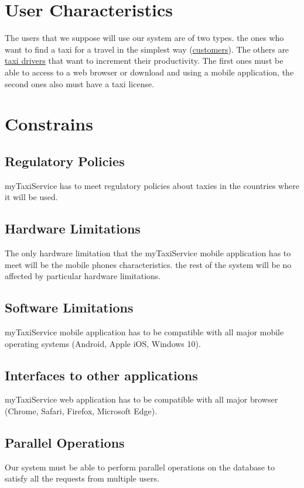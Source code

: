 \documentclass{report}
\begin{document}
	\section{User Characteristics}
	The users that we suppose will use our system are of two types. the ones who want to find a taxi for a travel in the simplest way (\hyperref[sec:customer]{customers}). The others are \hyperref[sec:tdriver]{taxi drivers} that want to increment their productivity. The first ones must be able to access to a web browser or download and using a mobile application, the second ones also must have a taxi license.
		
	\section{Constrains}
		
		\subsection{Regulatory Policies}
		myTaxiService  has to meet regulatory policies about taxies in the countries where it will be used.

		\subsection{Hardware Limitations}
		The only hardware limitation that the myTaxiService mobile application has to meet will be the mobile phones characteristics. the rest of the system will be no affected by particular hardware limitations.

		\subsection{Software Limitations}
		myTaxiService mobile application has to be compatible with all major mobile operating systems (Android, Apple iOS, Windows 10).

		\subsection{Interfaces to other applications}
		myTaxiService web application has to be compatible with all major browser (Chrome, Safari, Firefox, Microsoft Edge).

		\subsection{Parallel Operations}
		Our system must be able to perform parallel operations on the database to satisfy all the requests from multiple users.
\end{document}
